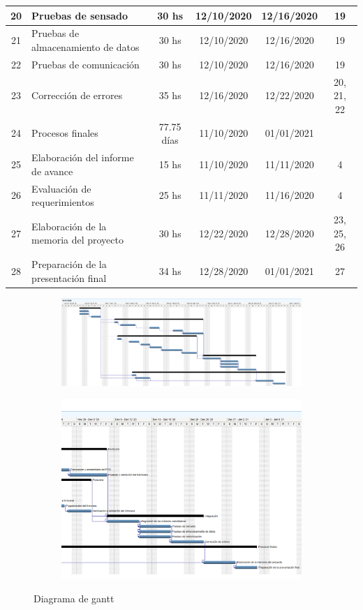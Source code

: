 \documentclass[11pt]{charter}
\begin{document}
\begin{table}[htpb]
\begin{tabularx}{\linewidth}{@{}|c|X|c|c|c|c|@{}}
20 & Pruebas de sensado &  30 hs & 12/10/2020 & 	12/16/2020 & 19\\ \hline
21 & Pruebas de almacenamiento de datos & 30 hs & 12/10/2020 & 	12/16/2020 &19\\ \hline
22 & Pruebas de comunicación & 30 hs & 12/10/2020 & 	12/16/2020 & 19\\ \hline
23 & Corrección de errores &  35 hs & 12/16/2020 & 	12/22/2020 &20, 21, 22\\ \hline
24 & Procesos finales &  77.75 días & 11/10/2020 & 	01/01/2021 & \\ \hline
25 & Elaboración del informe de avance &  15 hs & 11/10/2020 & 	11/11/2020 & 4\\ \hline
26 & Evaluación de requerimientos &  25 hs & 11/11/2020 & 	11/16/2020 & 4\\ \hline
27 & Elaboración de la memoria del proyecto &  30 hs & 12/22/2020 & 	12/28/2020 & 23, 25, 26\\ \hline
28 & Preparación de la presentación final &  34 hs &12/28/2020 & 	01/01/2021 &  27\\ 
\hline
\end{tabularx}%
\label{tab:gantt}
\end{table}

\begin{figure}[htpb]
\begin{subfigure}[b]{1\textwidth}
\centering 
\includegraphics[width=.93\textwidth]{./Figuras/gant.png}
\end{subfigure}
\begin{subfigure}[b]{1\textwidth}
\centering 
\includegraphics[width=.93\textwidth]{./Figuras/gant2.png}
\end{subfigure}
\caption{Diagrama de gantt}
\label{fig:gantt}
\end{figure}
\end{document}
